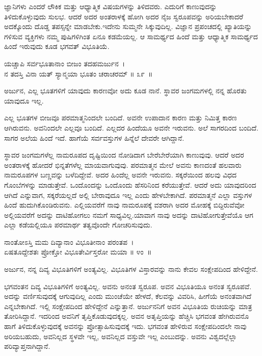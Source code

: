 ಜ್ಞಾನಿಗಳು ಎಂದರೆ ಲೌಕಿಕ ಮತ್ತು ಆಧ್ಯಾತ್ಮಿಕ ವಿಷಯಗಳನ್ನು ತಿಳಿದವರು. ಎದುರಿಗೆ ಕಾಣುವುದನ್ನು ತಿಳಿದುಕೊಳ್ಳುವುದು ಸುಲಭ. ಆದರೆ ಅದರ ಅಂತರಾಳಕ್ಕೆ ಹೋಗಿ ಅದರ ನೈಜ ಸ್ವರೂಪವನ್ನು ಅರಿಯಬೇಕಾದರೆ ಅದಕ್ಕೊಂದು ದೊಡ್ಡ ತಪಸ್ಸನ್ನೇ ಮಾಡಬೇಕು.ಇದೇನು ಸುಮ್ಮನೇ ಸಿಕ್ಕುವುದಿಲ್ಲ. ವಿಜ್ಞಾನ ಪ್ರಪಂಚದಲ್ಲಿ ಖ್ಯಾತಿಯನ್ನು ಗಳಿಸುವ ವ್ಯಕ್ತಿಗಳು ನಮ್ಮ ಪುಷಿಗಳಿಗಿಂತ ಏನೂ ಕಡಮೆಯಲ್ಲ. ಆ ಸಾಮರ್ಥ್ಯದ ಹಿಂದೆ ಮತ್ತು ಆಧ್ಯಾತ್ಮಿಕ ಸಾಮರ್ಥ್ಯದ ಹಿಂದೆ ಇರುವುದು ಕೂಡ ಭಗವತ್ ವಿಭೂತಿಯೆ.

\begin{shloka}
ಯಚ್ಚಾಪಿ ಸರ್ವಭೂತಾನಾಂ ಬೀಜಂ ತದಹಮರ್ಜುನ~।\\ನ ತದಸ್ತಿ ವಿನಾ ಯತ್ ಸ್ಯಾನ್ಮಯಾ ಭೂತಂ ಚರಾಚರಮ್ \hfill॥ ೩೯~॥
\end{shloka}

\begin{artha}
ಅರ್ಜುನ, ಎಲ್ಲ ಭೂತಗಳಿಗೆ ಯಾವುದು ಕಾರಣವೋ ಅದು ಕೂಡ ನಾನೆ. ಸ್ಥಾವರ ಜಂಗಮಗಳಲ್ಲಿ ನನ್ನ ಹೊರತು ಯಾವುದೂ ಇಲ್ಲ.
\end{artha}

ಎಲ್ಲ ಭೂತಗಳ ಬೀಜವೂ ಪರಮಾತ್ಮನಿಂದಲೇ ಬಂದಿದೆ. ಅವನೇ ಉಪಾದಾನ ಕಾರಣ ಮತ್ತು ನಿಮಿತ್ತ ಕಾರಣ ಆಗಿರುವನು. ಅವನಿಂದಲೇ ಎಲ್ಲವೂ ಬಂದಿದೆ. ಎಲ್ಲದರ ಹಿಂದೆಯೂ ಅವನೇ ಇರುವನು. ಅಲೆ ಸಾಗರದಿಂದ ಬಂದಿದೆ. ಸಾಗರ ಅಲೆಯ ಹಿಂದೆ ಇದೆ. ಹಾಗೆಯೆ ಸರ್ವವಸ್ತುಗಳ ಹಿನ್ನೆಲೆ ದೇವರೇ ಆಗಿದ್ದಾನೆ.

ಸ್ಥಾವರ ಜಂಗಮಗಳೆಲ್ಲ ನಾಮರೂಪದ ದೃಷ್ಟಿಯಿಂದ ನೋಡಿದಾಗ ಬೇರೆಬೇರೆಯಾಗಿ ಕಾಣುವುವು. ಆದರೆ ಅದರ ಅಂತರಾಳಕ್ಕೆ ಹೋದರೆ ಭಿನ್ನತೆಗಳೆಲ್ಲ ಮಾಯವಾಗುವುವು. ಪರ\-ಮಾತ್ಮನ ಮೇಲೆ ಅವನು ಕಾಣದಂತೆ ಹಲವಾರು ನಾಮರೂಪಗಳ ಬಣ್ಣವನ್ನು ಬಳೆದಿದ್ದೇವೆ. ಅದರ ಹಿಂದೆಲ್ಲ ಅವನೇ ಇರುವನು. ಸಕ್ಕರೆಯಿಂದ ಹಲವು ವಿಧದ ಗೊಂಬೆಗಳನ್ನು ಮಾಡುತ್ತೇವೆ. ಒಂದೊಂದನ್ನು ಒಂದೊಂದು ಹೆಸರಿನಿಂದ ಕರೆಯುತ್ತೇವೆ. ಆದರೆ ಅದು ಯಾವುದರಿಂದ ಆಗಿದೆ ಎನ್ನುವಾಗ, ಸಕ್ಕರೆಯಲ್ಲದೆ ಅಲ್ಲಿ ಬೇರಾವುದೂ ಇಲ್ಲ ಎಂದು ಹೇಳಬೇಕಾಗಿದೆ. ಪರಮಾತ್ಮನೆ ಎಲ್ಲಾ ವಸ್ತುಗಳ ಹಿಂದೆ ಹುದುಗಿಕೊಂಡಿರುವನು. ಎಲ್ಲಿಯವರೆಗೆ ನಾವು ನಾಮರೂಪಕ್ಕೆ ವಶರಾಗಿ ಅದರ ಮೋಹಕ್ಕೆ ಬಿದ್ದಿರುವೆವೋ ಅಲ್ಲಿಯವರೆಗೆ ಅದನ್ನು ದಾಟಿಹೋಗಲು ನಮಗೆ ಸಾಧ್ಯವಿಲ್ಲ.\break ಯಾವಾಗ ನಾವು ಅದನ್ನು ದಾಟಿಹೋಗುತ್ತೇವೆಯೊ ಆಗ ಎಲ್ಲಾ ಕಡೆಯಲ್ಲಿಯೂ ಪರಮಾರ್ಥ ತತ್ವವೊಂದೇ ಗೋಚರಿಸುವುದು.

\begin{shloka}
ನಾಂತೋಽಸ್ತಿ ಮಮ ದಿವ್ಯಾನಾಂ ವಿಭೂತೀನಾಂ ಪರಂತಪ~।\\ಏಷತೂದ್ದೇಶತಃ ಪ್ರೋಕ್ತೋ ವಿಭೂತೇರ್ವಿಸ್ತರೋ ಮಯಾ \hfill॥ ೪ಂ~॥
\end{shloka}

\begin{artha}
ಅರ್ಜುನ, ನನ್ನ ದಿವ್ಯ ವಿಭೂತಿಗಳಿಗೆ ಅಂತ್ಯವಿಲ್ಲ. ವಿಭೂತಿಗಳ ವಿಸ್ತಾರವನ್ನು ನಾನು ಕೇವಲ ಸಂಕ್ಷೇಪದಿಂದ ಹೇಳಿದ್ದೇನೆ.
\end{artha}

ಭಗವಂತನ ದಿವ್ಯ ವಿಭೂತಿಗಳಿಗೆ ಅಂತ್ಯವಿಲ್ಲ. ಅವನು ಅನಂತ ಸ್ವರೂಪ. ಅವನ ವಿಭೂತಿಯೂ ಅನಂತ ಸ್ವರೂಪವೆ. ಅದನ್ನು ವರ್ಣಿಸುವುದಕ್ಕೆ ಆಗುವುದಿಲ್ಲ ಎಂದು ಮುಂಚೆಯೇ ಹೇಳದೆ, ಕೆಲವನ್ನು ವಿವರಿಸಿ, ಹೀಗೆಯೆ ಅನಂತವಾಗಿದೆ ಎನ್ನಬೇಕಾಗಿದೆ. ಇಲ್ಲಿ ಸಂಕ್ಷೇಪದಿಂದ ಹೇಳಿದ್ದೇನೆ ಎನ್ನುತ್ತಾನೆ. ಅರ್ಜುನನಿಗೆ ಅವನ ವಿಭೂತಿಯ ರುಚಿಯನ್ನು ಮಾತ್ರ ತೋರಿಸಿದ್ದಾನೆ. ಇದರಿಂದ ಅವನಿಗೆ ತೃಪ್ತಿಕೊಡುವುದಕ್ಕಲ್ಲ. ಅವನ ಅತೃಪ್ತಿಯನ್ನು ಹೆಚ್ಚಿಸಿ ಭಗವಂತ ಹೇಗಿರುವನೊ ಹಾಗೆ ತಿಳಿದುಕೊಳ್ಳುವುದಕ್ಕೆ ಅವನನ್ನು ಪ್ರೋತ್ಸಾಹಿಸುವುದಕ್ಕೆ ಇದು. ಭಗವಂತ ಹೇಳಿರುವ ಸಂಕ್ಷೇಪದಿಂದಲೇ ನಾವು ಅರಿಯಬಹುದು, ಅವನಿಲ್ಲದ ಸ್ಥಳವೇ ಇಲ್ಲ, ಅವನಿಲ್ಲದ ವಸ್ತುವೇ ಇಲ್ಲ ಎಂಬುದನ್ನು. ಅವನು ವಿಶ್ವದಲ್ಲೆಲ್ಲಾ ಪರಿವ್ಯಾಪ್ತನಾಗಿದ್ದಾನೆ.

